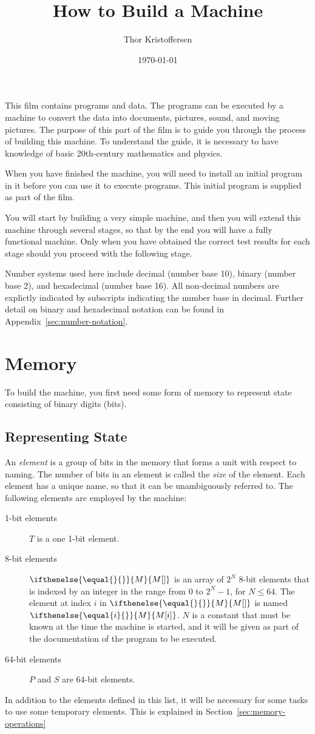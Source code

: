 \documentclass[a4paper,12pt]{article}
\author{Thor Kristoffersen}
\date{\today}
\title{How to Build a Machine}
\newcommand{\MEM}[1]{\ifthenelse{\equal{#1}{}}{M}{M[#1]}}
\newcommand{\PC}{P}
\newcommand{\SP}{S}
\newcommand{\TERM}{T}
\theoremstyle{definition}
\begin{document}
\maketitle

\noindent
This film contains programs and data.
The programs can be executed by a machine to convert the data into documents, pictures, sound, and moving pictures.
The purpose of this part of the film is to guide you through the process of building this machine.
To understand the guide, it is necessary to have knowledge of basic 20th-century mathematics and physics.

When you have finished the machine, you will need to install an initial program in it before you can use it to execute programs.
This initial program is supplied as part of the film.

You will start by building a very simple machine, and then you will extend this machine through several stages, so that by the end you will have a fully functional machine.
Only when you have obtained the correct test results for each stage should you proceed with the following stage.

Number systems used here include decimal (number base 10), binary (number base 2), and hexadecimal (number base 16).
All non-decimal numbers are explictly indicated by subscripts indicating the number base in decimal.
Further detail on binary and hexadecimal notation can be found in Appendix~\ref{sec:number-notation}.

\section{Memory}

To build the machine, you first need some form of memory to represent state consisting of binary digits (bits).

\subsection{Representing State}

An \emph{element} is a group of bits in the memory that forms a unit with respect to naming.
The number of bits in an element is called the \emph{size} of the element.
Each element has a unique name, so that it can be unambiguously referred to.
The following elements are employed by the machine:
\begin{description}
\item[1-bit elements]
  $\TERM$ is a one 1-bit element.
\item[8-bit elements]
  $\MEM{}$ is an array of $2^N$ 8-bit elements that is indexed by an integer in the range from $0$ to $2^N - 1$, for $N \le 64$.
  The element at index $i$ in $\MEM{}$ is named $\MEM{i}$.
  $N$ is a constant that must be known at the time the machine is started, and it will be given as part of the documentation of the program to be executed.
\item[64-bit elements]
  $\PC$ and $\SP$ are 64-bit elements.
\end{description}
In addition to the elements defined in this list, it will be necessary for some tasks to use some temporary elements.
This is explained in Section~\ref{sec:memory-operations}
\end{document}
